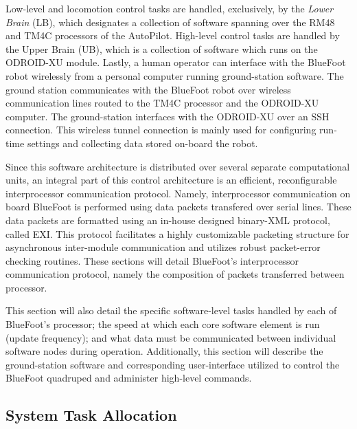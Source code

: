 	Low-level and locomotion control tasks are handled, exclusively, by the \emph{Lower Brain} (LB), which designates a collection of software spanning over the RM48 and TM4C processors of the AutoPilot. High-level control tasks are handled by the Upper Brain (UB), which is a collection of software which runs on the ODROID-XU module. Lastly, a human operator can interface with the BlueFoot robot wirelessly from a personal computer running ground-station software. The ground station communicates with the BlueFoot robot over wireless communication lines routed to the TM4C processor and the ODROID-XU computer. The ground-station interfaces with the ODROID-XU over an SSH connection. This wireless tunnel connection is mainly used for configuring run-time settings and collecting data stored on-board the robot.

	Since this software architecture is distributed over several separate computational units, an integral part of this control architecture is an efficient, reconfigurable interprocessor communication protocol. Namely, interprocessor communication on board BlueFoot is performed using data packets transfered over serial lines. These data packets are formatted using an in-house designed binary-XML protocol, called EXI. This protocol facilitates a highly customizable packeting structure for asynchronous inter-module communication and utilizes robust packet-error checking routines. These sections will detail BlueFoot's interprocessor communication protocol, namely the composition of packets transferred between processor. 

	This section will also detail the specific software-level tasks handled by each of BlueFoot's processor; the speed at which each core software element is run (update frequency); and what data must be communicated between individual software nodes during operation. Additionally, this section will describe the ground-station software and corresponding user-interface utilized to control the BlueFoot quadruped and administer high-level commands.
	
	\subsection{System Task Allocation}

